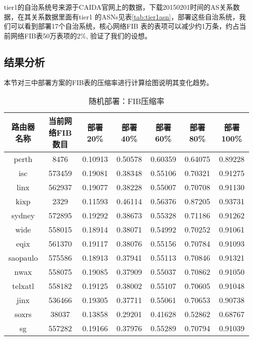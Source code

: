 tier1的自治系统号来源于CAIDA官网上的数据，下载20150201时间的AS关系数据，在其关系数据里面有tier1 的ASNs见表\ref{tab:tier1asn}，部署这些自治系统，我们可以看到部署17个自治系统，核心网络FIB 表的表项可以减少约1万条，约占当前网络FIB表50万表项的2\%, 验证了我们的设想。

\subsection{结果分析}
本节对三中部署方案的FIB表的压缩率进行计算绘图说明其变化趋势。

\begin{table}[h]
    \centering
    \caption{随机部署：FIB压缩率}
    \label{tab:origindatarate}
        \begin{tabular}{|c|c|c|c|c|c|c|}
            \hline
            路由器名称 & 当前网络FIB数目 & 部署20\% &部署40\% &部署60\% &部署80\% &部署100\% \\ \hline
            perth    & 8476   & 0.10913   & 0.50578  & 0.60359   & 0.64075   & 0.89228     \\ \hline
            isc      & 573459 & 0.19081 & 0.38348 & 0.55106 & 0.70321 & 0.91275    \\ \hline
            linx     & 562937 & 0.19077 & 0.38228 & 0.55007 & 0.70708 & 0.91130     \\ \hline
            kixp     & 2329   & 0.11593   & 0.46114   & 0.56376   & 0.87205    & 0.93731        \\ \hline
            sydney   & 572895 & 0.19292 & 0.38673 & 0.55328 & 0.71186 & 0.91262       \\ \hline
            wide     & 558015 & 0.18914 & 0.38071 & 0.54992 & 0.70252 & 0.91061        \\ \hline
            eqix     & 561370 & 0.19117 & 0.38076& 0.55156 & 0.70784 & 0.91093         \\ \hline
            saopaulo & 575586 & 0.18913 & 0.37941 & 0.55113 & 0.70846 & 0.91321          \\ \hline
            nwax     & 558075 & 0.19085 & 0.37909 & 0.55037 & 0.70862 & 0.91050           \\ \hline
            telxatl  & 558182 & 0.19125 & 0.38002 & 0.55107 & 0.70605 & 0.91048            \\ \hline
            jinx     & 536466 & 0.19305 & 0.37711 & 0.55061 & 0.70653 & 0.90738             \\ \hline
            soxrs    & 38037  & 0.13858  & 0.29201  & 0.41628  & 0.52862  & 0.68767            \\ \hline
            sg       & 557282 & 0.19166 & 0.37976 & 0.55289 & 0.70794 & 0.91039              \\ \hline
        \end{tabular}
\end{table}

